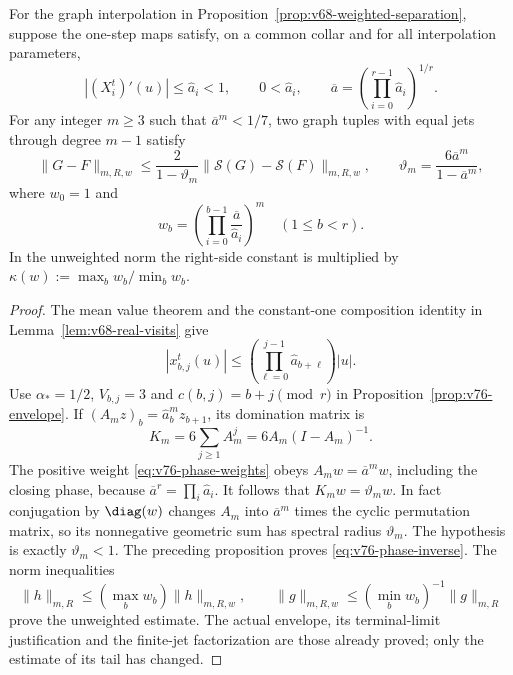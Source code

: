 \begin{corollary}
\label{cor:v76-phase-separation}
For the graph interpolation in
Proposition~\ref{prop:v68-weighted-separation}, suppose the one-step
maps satisfy, on a common collar and for all interpolation parameters,
\[
 |(X_i^t)'(u)|\le\widehat a_i<1,\qquad 0<\widehat a_i,
 \qquad \overline a=\left(\prod_{i=0}^{r-1}\widehat a_i\right)^{1/r}.
\]
For any integer $m\ge3$ such that $\overline a^m<1/7$, two graph
tuples with equal jets through degree $m-1$ satisfy
\begin{equation}\label{eq:v76-phase-inverse}
 \|G-F\|_{m,R,w}\le
 \frac{2}{1-\vartheta_m}\|\mathcal S(G)-\mathcal S(F)\|_{m,R,w},
 \qquad \vartheta_m=\frac{6\overline a^m}{1-\overline a^m},
\end{equation}
where $w_0=1$ and
\begin{equation}\label{eq:v76-phase-weights}
 w_b=\left(\prod_{i=0}^{b-1}\frac{\overline a}{\widehat a_i}\right)^m
 \quad(1\le b<r).
\end{equation}
In the unweighted norm the right-side constant is multiplied by
$\kappa(w):=\max_bw_b/\min_bw_b$.
\end{corollary}
\begin{proof}
The mean value theorem and the constant-one composition identity in
Lemma~\ref{lem:v68-real-visits} give
\[
 |x_{b,j}^t(u)|\le
       \left(\prod_{\ell=0}^{j-1}\widehat a_{b+\ell}\right)|u|.
\]
Use $\alpha_*=1/2$, $V_{b,j}=3$ and $c(b,j)=b+j\pmod r$ in
Proposition~\ref{prop:v76-envelope}.  If
$(A_mz)_b=\widehat a_b^m z_{b+1}$, its domination matrix is
\[
 K_m=6\sum_{j\ge1}A_m^j=6A_m(I-A_m)^{-1}.
\]
The positive weight \eqref{eq:v76-phase-weights} obeys
$A_mw=\overline a^m w$, including the closing phase, because
$\overline a^r=\prod_i\widehat a_i$.
It follows that $K_mw=\vartheta_m w$.  In fact conjugation by
$\diag(w)$ changes $A_m$ into $\overline a^m$ times the cyclic
permutation matrix, so its nonnegative geometric sum has spectral
radius $\vartheta_m$.  The hypothesis is exactly
$\vartheta_m<1$.  The preceding proposition proves
\eqref{eq:v76-phase-inverse}.  The norm inequalities
\[
 \|h\|_{m,R}\le(\max_bw_b)\|h\|_{m,R,w},\qquad
 \|g\|_{m,R,w}\le(\min_bw_b)^{-1}\|g\|_{m,R}
\]
prove the unweighted estimate.  The actual envelope, its terminal-limit
justification and the finite-jet factorization are those already proved;
only the estimate of its tail has changed.
\end{proof}

